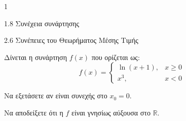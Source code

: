 \begin{ylh}{1}
    \item 1.8 Συνέχεια συνάρτησης
    \item 2.6 Συνέπειες του Θεωρήματος Μέσης Τιμής
\end{ylh}
Δίνεται η συνάρτηση $f(x)$ που ορίζεται ως:
\[ f(x) = \begin{cases} \ln(x+1), & x \geq 0 \\ x^3, & x < 0 \end{cases} \]
\begin{alist}
\item Να εξετάσετε αν είναι συνεχής στο $x_0 = 0$. 
\item Να αποδείξετε ότι η $f$ είναι γνησίως αύξουσα στο $\mathbb{R}$. 
\end{alist}
